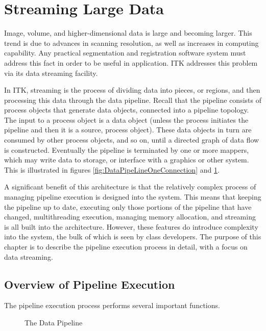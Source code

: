 \section{Streaming Large Data}
\label{sec:StreamingLargeData}

Image, volume, and higher-dimensional data is large and becoming larger. This
trend is due to advances in scanning resolution, as well as increases in
computing capability. Any practical segmentation and registration software
system must address this fact in order to be useful in application. ITK
addresses this problem via its data streaming facility.

In ITK, streaming is the process of dividing data into pieces, or regions,
and then processing this data through the data pipeline. Recall that the
pipeline consists of process objects that generate data objects, connected
into a pipeline topology. The input to a process object is a data object
(unless the process initiates the pipeline and then it is a source, process
object). These data objects in turn are consumed by other process objects,
and so on, until a directed graph of data flow is constructed. Eventually the
pipeline is terminated by one or more mappers, which may write data to
storage, or interface with a graphics or other system. This is illustrated in 
figures \ref{fig:DataPipeLineOneConnection} and \ref{fig:DataPipeLine}.

A significant benefit of this architecture is that the relatively complex
process of managing pipeline execution is designed into the system. This
means that keeping the pipeline up to date, executing only those portions of
the pipeline that have changed, multithreading execution, managing memory
allocation, and streaming is all built into the architecture. However, these
features do introduce complexity into the system, the bulk of which is seen
by class developers. The purpose of this chapter is to describe the pipeline
execution process in detail, with a focus on data streaming.


\subsection{Overview of Pipeline Execution}
\label{sec:OverviewPipelineExecution}

The pipeline execution process performs several important functions.

\begin{figure}
  \par\centering
  \caption{\label{fig:DataPipeLine}The Data Pipeline}
  \par
\end{figure}

